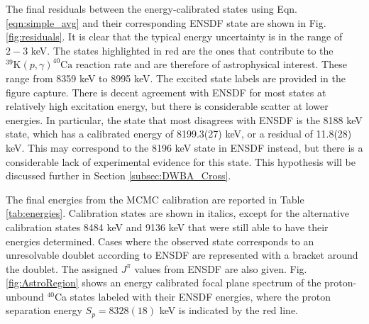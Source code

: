 The final residuals between the energy-calibrated states using Eqn. \ref{eqn:simple_avg} and their corresponding ENSDF state are shown in Fig. \ref{fig:residuals}. It is clear that the typical energy uncertainty is in the range of $2-3$ keV. The states highlighted in red are the ones that contribute to the $^{39}\mathrm{K}(p,\gamma)^{40}\mathrm{Ca}$ reaction rate and are therefore of astrophysical interest. These range from 8359 keV to 8995 keV. The excited state labels are provided in the figure capture. There is decent agreement with ENSDF for most states at relatively high excitation energy, but there is considerable scatter at lower energies. In particular, the state that most disagrees with ENSDF is the 8188 keV state, which has a calibrated energy of 8199.3(27) keV, or a residual of 11.8(28) keV. This may correspond to the 8196 keV state in ENSDF instead, but there is a considerable lack of experimental evidence for this state. This hypothesis will be discussed further in Section \ref{subsec:DWBA_Cross}.

The final energies from the MCMC calibration are reported in Table \ref{tab:energies}. Calibration states are shown in italics, except for the alternative calibration states 8484 keV and 9136 keV that were still able to have their energies determined. Cases where the observed state corresponds to an unresolvable doublet according to ENSDF are represented with a bracket around the doublet. The assigned $J^{\pi}$ values from ENSDF are also given. Fig. \ref{fig:AstroRegion} shows an energy calibrated focal plane spectrum of the proton-unbound $^{40}$Ca states labeled with their ENSDF \cite{Chen2017} energies, where the proton separation energy $S_{p} = 8328(18)$ keV is indicated by the red line.

\newpage


